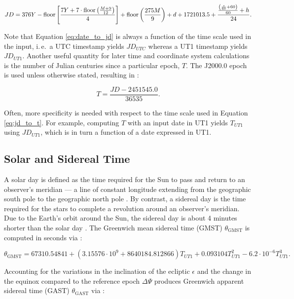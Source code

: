 \begin{equation} \label{eq:date_to_jd}
  JD = 376Y - \operatorname{floor}{\left[ \frac{7Y + 7 \cdot \operatorname{floor}{\left(\frac{M + 9}{12} \right)}}{4} \right]}
      + \operatorname{floor}{\left(\frac{275M}{9}\right)} 
      + d
      + 1721013.5
      + \frac{\frac{\left(\frac{s}{60} + 60\right)}{60} + h}{24}.
\end{equation}

Note that Equation \ref{eq:date_to_jd} is always a function of the time scale used in the input, i.\,e.\, a UTC timestamp yields $JD_{UTC}$ whereas a UT1 timestamp yields $JD_{UT1}$. Another useful quantity for later time and coordinate system calculations is the number of Julian centuries since a particular epoch, $T$. The J2000.0 epoch is used unless otherwise stated, resulting in \cite{vallado4ed}:

\begin{equation} \label{eq:jd_to_t}
  T = \frac{JD - 2451545.0}{36535}.
\end{equation}

Often, more specificity is needed with respect to the time scale used in Equation \ref{eq:jd_to_t}. For example, computing $T$ with an input date in UT1 yields $T_{UT1}$ using $JD_{UT1}$, which is in turn a function of a date expressed in UT1. 

\subsection{Solar and Sidereal Time}

A solar day is defined as the time required for the Sun to pass and return to an observer's meridian --- a line of constant longitude extending from the geographic south pole to the geographic north pole \cite{vallado4ed}. By contrast, a sidereal day is the time required for the stars to complete a revolution around an observer's meridian. Due to the Earth's orbit around the Sun, the sidereal day is about 4 minutes shorter than the solar day \cite{vallado4ed}. The Greenwich mean sidereal time (GMST) $\theta_\mathrm{GMST}$ is computed in seconds via \cite{frueh2019notes}:

\begin{equation} \label{eq:date_to_gmst}
  \theta_\mathrm{GMST} = 67310.54841
        + \left(3.15576 \cdot 10^9 + 8640184.812866 \right) T_{UT1}
        + 0.093104 T_{UT1}^2
        - 6.2 \cdot 10^{-6} T_{UT1}^3.
\end{equation}

Accounting for the variations in the inclination of the ecliptic $\epsilon$ and the change in the equinox compared to the reference epoch $\Delta \Psi$ produces Greenwich apparent sidereal time (GAST) $\theta_\mathrm{GAST}$ via \cite{frueh2019notes}:


